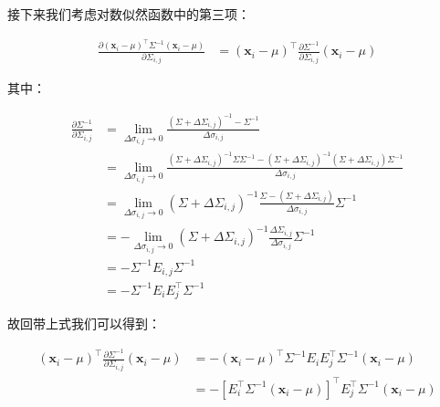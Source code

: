 \documentclass[UTF8]{book}
\begin{document}
接下来我们考虑对数似然函数中的第三项：
\begin{large}
    \begin{equation}
        \begin{aligned}
            \frac{\partial (\mathbf{x}_i-\mu)^\top\Sigma^{-1}(\mathbf{x}_i-\mu)}{\partial \Sigma_{i,j}} &= (\mathbf{x}_i-\mu)^\top\frac{\partial \Sigma^{-1}}{\partial \Sigma_{i,j}}(\mathbf{x}_i-\mu)
            \nonumber
        \end{aligned}
    \end{equation}
\end{large}
其中：
\begin{large}
    \begin{equation}
        \begin{aligned}
            \frac{\partial \Sigma^{-1}}{\partial \Sigma_{i,j}} &= \lim_{\Delta \sigma_{i,j}\rightarrow 0}\frac{(\Sigma+\Delta\Sigma_{i,j})^{-1}-\Sigma^{-1}}{\Delta \sigma_{i,j}} \\
            &= \lim_{\Delta \sigma_{i,j}\rightarrow 0}\frac{(\Sigma+\Delta\Sigma_{i,j})^{-1}\Sigma\Sigma^{-1}-(\Sigma+\Delta\Sigma_{i,j})^{-1}(\Sigma+\Delta\Sigma_{i,j})\Sigma^{-1}}{\Delta \sigma_{i,j}} \\
            &= \lim_{\Delta \sigma_{i,j}\rightarrow 0}(\Sigma+\Delta\Sigma_{i,j})^{-1}\frac{\Sigma-(\Sigma+\Delta\Sigma_{i,j})}{\Delta \sigma_{i,j}}\Sigma^{-1} \\
            &= -\lim_{\Delta \sigma_{i,j}\rightarrow 0}(\Sigma+\Delta\Sigma_{i,j})^{-1}\frac{\Delta\Sigma_{i,j}}{\Delta \sigma_{i,j}}\Sigma^{-1} \\
            &= -\Sigma^{-1} E_{i,j} \Sigma^{-1} \\
            &= -\Sigma^{-1} E_{i} E_{j}^\top \Sigma^{-1}
            \nonumber
        \end{aligned}
    \end{equation}
\end{large}
故回带上式我们可以得到：
\begin{large}
    \begin{equation}
        \begin{aligned}
            (\mathbf{x}_i-\mu)^\top\frac{\partial \Sigma^{-1}}{\partial \Sigma_{i,j}}(\mathbf{x}_i-\mu) &= -(\mathbf{x}_i-\mu)^\top \Sigma^{-1} E_{i} E_{j}^\top \Sigma^{-1} (\mathbf{x}_i-\mu) \\
            &= -\left[E_{i}^\top \Sigma^{-1} (\mathbf{x}_i-\mu) \right]^\top E_{j}^\top \Sigma^{-1} (\mathbf{x}_i-\mu)
            \nonumber
        \end{aligned}
    \end{equation}
\end{large}
\end{document}
